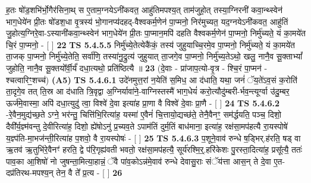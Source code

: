 \documentclass[17pt]{extarticle}
\begin{document}
                  ह॒तः षो॑ड॒शभि॑र्भो॒गैर॑सिना॒थ् स ए॒ताम॒ग्नयेऽनी॑कवत॒ आहु॑तिमपश्य॒त् ताम॑जुहो॒त् तस्या॒ग्निरनी॑ कवा॒न्थ्स्वेन॑ भाग॒धेये॑न प्री॒तः षो॑डश॒धा वृ॒त्रस्य॑ भो॒गानप्य॑दहद्-वैश्वकर्म॒णेन॑ पा॒प्मनो॒ निर॑मुच्यत॒ यद॒ग्नयेऽनी॑कवत॒ आहु॑तिं जु॒होत्य॒ग्निरे॒वा-ऽस्यानी॑कवा॒न्थ्स्वेन॑ भाग॒धेये॑न प्री॒तः पा॒प्मान॒मपि॑ दहति वैश्वकर्म॒णेन॑ पा॒प्मनो॒ निर्मु॑च्यते॒ यं का॒मये॑त चि॒रं पा॒प्मनो॒ - [  ] \textbf{  22} \newline
                  \newline
                                \textbf{ TS 5.4.5.5} \newline
                  निर्मु॑च्ये॒तेत्येकै॑कं॒ तस्य॑ जुहुयाच्चि॒रमे॒व पा॒प्मनो॒ निर्मु॑च्यते॒ यं का॒मये॑त ता॒जक् पा॒प्मनो॒ निर्मु॑च्ये॒तेति॒ सर्वा॑णि॒ तस्या॑नु॒द्रुत्य॑ जुहुयात् ता॒जगे॒व पा॒प्मनो॒ निर्मु॑च्य॒तेऽथो॒ खलु॒ नानै॒व सू॒क्ताभ्यां᳚ जुहोति॒ नानै॒व सू॒क्तयो᳚र्वी॒र्यं॑ दधा॒त्यथो॒ प्रति॑ष्ठित्यै ॥ \textbf{  23 } \newline
                  \newline
                      (दे॒वाः - प्रा॑जाप॒त्यो-वृ॒त्र - श्चि॒रं पा॒प्मन॑ - श्चत्वारिꣳ॒॒शच्च॑)  \textbf{(A5)} \newline \newline
                                        \textbf{ TS 5.4.6.1} \newline
                  उदे॑नमुत्त॒रां न॒येति॑ स॒मिध॒ आ द॑धाति॒ यथा॒ जनं॑ ॅय॒ते॑ऽव॒सं क॒रोति॑ ता॒दृगे॒व तत् ति॒स्र आ द॑धाति त्रि॒वृद्वा अ॒ग्निर्यावा॑ने॒-वाग्निस्तस्मै॑ भाग॒धेयं॑ करो॒त्यौदु॑म्बरी-र्भव॒न्त्यूर्ग्वा उ॑दु॒म्बर॒ ऊर्ज॑मे॒वास्मा॒ अपि॑ दधा॒त्युदु॑ त्वा॒ विश्वे॑ दे॒वा इत्या॑ह प्रा॒णा वै विश्वे॑ दे॒वाः प्रा॒णै - [  ] \textbf{  24} \newline
                  \newline
                                \textbf{ TS 5.4.6.2} \newline
                  -रे॒वैन॒मुद्य॑च्छ॒ते ऽग्ने॒ भर॑न्तु॒ चित्ति॑भि॒रित्या॑ह॒ यस्मा॑ ए॒वैनं॑ चि॒त्तायो॒द्यच्छ॑ते॒ तेनै॒वैनꣳ॒॒ सम॑र्द्धयति॒ पञ्च॒ दिशो॒ दैवी᳚र्य॒ज्ञ्म॑वन्तु दे॒वीरित्या॑ह॒ दिशो॒ ह्ये॑षोऽनु॑ प्र॒च्यव॒ते ऽपाम॑तिं दुर्म॒तिं बाध॑माना॒ इत्या॑ह॒ रक्ष॑सा॒मप॑हत्यै रा॒यस्पोषे॑ य॒ज्ञ्प॑ति-मा॒भज॑न्ती॒रित्या॑ह प॒शवो॒ वै रा॒यस्पोषः॑ - [  ] \textbf{  25} \newline
                  \newline
                                \textbf{ TS 5.4.6.3} \newline
                  प॒शूने॒वाव॑ रुन्धे ष॒ड्भिर्.ह॑रति॒ षड् वा ऋ॒तव॑ ऋ॒तुभि॑रे॒वैनꣳ॑ हरति॒ द्वे प॑रि॒गृह्य॑वती भवतो॒ रक्ष॑सा॒मप॑हत्यै॒ सूर्य॑रश्मि॒र्॒.हरि॑केशः पु॒रस्ता॒दित्या॑ह॒ प्रसू᳚त्यै॒ ततः॑ पाव॒का आ॒शिषो॑ नो जुषन्ता॒मित्या॒हान्नं॒ ॅवै पा॑व॒कोऽन्न॑मे॒वाव॑ रुन्धे देवासु॒राः संॅय॑त्ता आस॒न् ते दे॒वा ए॒त-दप्र॑तिरथ-मपश्य॒न् तेन॒ वै ते᳚ प्र॒त्य - [  ] \textbf{  26} \newline
\end{document}
